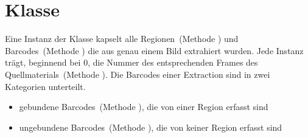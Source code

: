 \section{Klasse }
Eine Instanz der Klasse  kapselt alle Regionen~(Methode ) und Barcodes~(Methode ) die aus genau einem Bild extrahiert wurden.
Jede Instanz trägt, beginnend bei 0, die Nummer des entsprechenden Frames des Quellmaterials~(Methode ).
Die Barcodes einer Extraction sind in zwei Kategorien unterteilt.
\begin{itemize}
  \item gebundene Barcodes~(Methode ), die von einer Region erfasst sind
  \item ungebundene Barcodes~(Methode ), die von keiner Region erfasst sind
\end{itemize}


